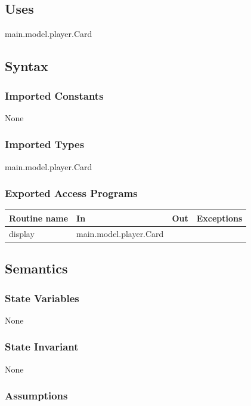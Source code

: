 \documentclass[12pt, titlepage]{article}
\begin{document}
\subsection* {Uses}

main.model.player.Card

\subsection* {Syntax}

\subsubsection* {Imported Constants}

None

\subsubsection* {Imported Types}

main.model.player.Card

\subsubsection* {Exported Access Programs}

\begin{tabular}{| l | l | l | p{5cm} |}
\hline
\textbf{Routine name} & \textbf{In} & \textbf{Out} & \textbf{Exceptions}\\
\hline
display & main.model.player.Card & &\\
\hline  
\end{tabular}

\subsection* {Semantics}

\subsubsection* {State Variables}

None

\subsubsection* {State Invariant}

None

\subsubsection* {Assumptions}
\end{document}
